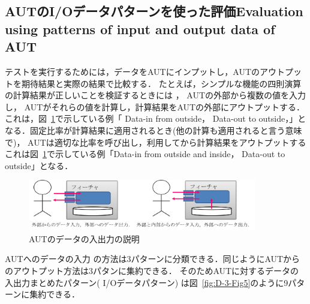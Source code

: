 \documentclass[a4paper,12pt]{jreport}
\begin{document}
\subsection{AUTのI/Oデータパターンを使った評価Evaluation using patterns of input and output data of AUT}


 テストを実行するためには，データをAUTにインプットし，AUTのアウトプットを期待結果と実際の結果で比較する．
 たとえば，シンプルな機能の四則演算の計算結果が正しいことを検証するときには ， AUTの外部から複数の値を入力し， AUTがそれらの値を計算し，計算結果をAUTの外部にアウトプットする．
 これは，図~\ref{fig:D-3-Fig4}で示している例「 Data-in from outside， Data-out to outside，」となる．固定比率が計算結果に適用されるとき(他の計算も適用されると言う意味で)， AUTは適切な比率を呼び出し，利用してから計算結果をアウトプットするこれは図~\ref{fig:D-3-Fig4}で示している例「Data-in from outside 	and  inside， Data-out to outside」となる．

 \begin{figure}[h]
  \begin{center}
  \includegraphics[width=10cm]{./image/D-3-Fig4.png}
  \caption{AUTのデータの入出力の説明}
  \label{fig:D-3-Fig4}
  \end{center}
   \end{figure}


AUTへのデータの入力 の方法は3パターンに分類できる．同じようにAUTからのアウトプット方法は3パタンに集約できる．  そのためAUTに対するデータの入出力まとめたパターン( I/Oデータパターン) は図~\ref{fig:D-3-Fig5}のように9パターンに集約できる．
\end{document}
